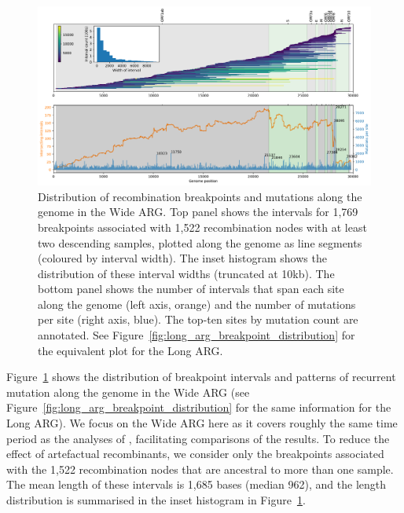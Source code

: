 \documentclass{article}
\begin{document}
\begin{figure}
\centering
\includegraphics[width=\textwidth]{figures/wide_arg_recombination_intervals.pdf}
\caption{\label{fig:breakpoint-distribution}
Distribution of recombination breakpoints and mutations along the genome in
the Wide ARG. Top panel shows the intervals for 1,769 breakpoints associated
with 1,522 recombination nodes with at least two descending samples, plotted along the genome
as line segments (coloured by interval width). The inset histogram shows the
distribution of these interval widths (truncated at 10kb).
The bottom panel shows the number of intervals that span
each site along the genome (left axis, orange) and the number of mutations
per site (right axis, blue).
The top-ten sites by mutation count are annotated.
See Figure~\ref{fig:long_arg_breakpoint_distribution} for the equivalent plot
for the Long ARG.}
\end{figure}

Figure~\ref{fig:breakpoint-distribution} shows the distribution of breakpoint
intervals and patterns of recurrent mutation along the genome in the Wide ARG
(see Figure~\ref{fig:long_arg_breakpoint_distribution} for the same information
for the Long ARG). We focus on the Wide ARG here as it covers roughly the same time
period as the analyses of \cite{Turakhia2022-it}, facilitating comparisons
of the results. To reduce the effect of artefactual recombinants, we
consider only the breakpoints associated with the 1,522 recombination nodes
that are ancestral to more than one sample. The mean length of these intervals
is 1,685 bases (median 962), and the length distribution is summarised in the
inset histogram in Figure~\ref{fig:breakpoint-distribution}.
\end{document}
